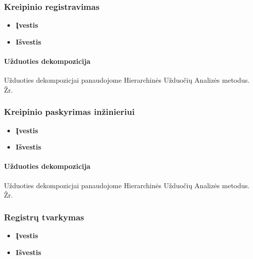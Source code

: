 	\subsubsection{Kreipinio registravimas}

		\begin{itemize}
			\item \textbf{Įvestis}
			\item \textbf{Išvestis} 
		\end{itemize}
		
		
	\paragraph{Užduoties dekompozicija}


	Užduoties dekompozicjai panaudojome Hierarchinės Užduočių Analizės metodus.
	Žr. 
	
	
	\subsubsection{Kreipinio paskyrimas inžinieriui}

		\begin{itemize}
			\item \textbf{Įvestis}
			\item \textbf{Išvestis} 
		\end{itemize}
		
		
	\paragraph{Užduoties dekompozicija}


	
	Užduoties dekompozicjai panaudojome Hierarchinės Užduočių Analizės metodus.
	Žr. 

	
	\subsubsection{Registrų tvarkymas}

		\begin{itemize}
			\item \textbf{Įvestis}
			\item \textbf{Išvestis} 
		\end{itemize}
		
